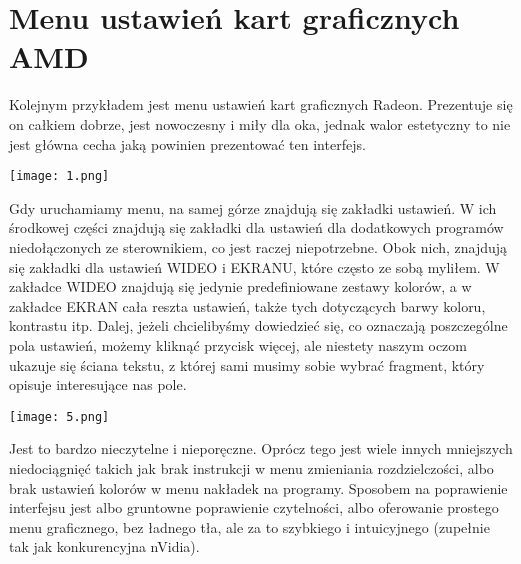 \documentclass[12pt]{article}
\begin{document}
 \section{Menu ustawień kart graficznych AMD}
Kolejnym przykładem jest menu ustawień kart graficznych Radeon. Prezentuje się on całkiem dobrze, jest nowoczesny i miły dla oka, jednak walor estetyczny to nie jest główna cecha jaką powinien prezentować ten interfejs.
 \newline
 \begin{center}
 \texttt{[image: 1.png]}
\end{center}
Gdy uruchamiamy menu, na samej górze znajdują się zakładki ustawień. W ich środkowej części znajdują się zakładki dla ustawień dla dodatkowych programów niedołączonych ze sterownikiem, co jest raczej niepotrzebne. Obok nich, znajdują się zakładki dla ustawień WIDEO i EKRANU, które często ze sobą myliłem. W zakładce WIDEO znajdują się jedynie predefiniowane zestawy kolorów, a w zakładce EKRAN cała reszta ustawień, także tych dotyczących barwy koloru, kontrastu itp. Dalej, jeżeli chcielibyśmy dowiedzieć się, co oznaczają poszczególne pola ustawień, możemy kliknąć przycisk więcej, ale niestety naszym oczom ukazuje się ściana tekstu, z której sami musimy sobie wybrać fragment, który opisuje interesujące nas pole.
\newline
\begin{center}
\texttt{[image: 5.png]}
\end{center} Jest to bardzo nieczytelne i nieporęczne. Oprócz tego jest wiele innych mniejszych niedociągnięć takich jak brak instrukcji w menu zmieniania rozdzielczości, albo brak ustawień kolorów w menu nakładek na programy. Sposobem na poprawienie interfejsu jest albo gruntowne poprawienie czytelności, albo oferowanie prostego menu graficznego, bez ładnego tła, ale za to szybkiego i intuicyjnego (zupełnie tak jak konkurencyjna nVidia).
 
\end{document}
